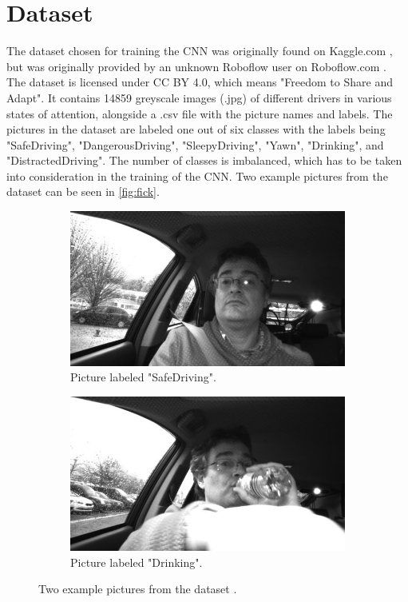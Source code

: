 \section{Dataset}
The dataset chosen for training the CNN was originally found on Kaggle.com \cite{kag_set}, but was originally provided by an unknown Roboflow user on Roboflow.com \cite{rob_set}.
The dataset is licensed under CC BY 4.0, which means "Freedom to Share and Adapt".
It contains 14859 greyscale images (.jpg) of different drivers in various states of attention, alongside a .csv file with the picture names and labels. The pictures in the dataset are labeled one out of six classes with the labels being "SafeDriving", "DangerousDriving", "SleepyDriving", "Yawn", "Drinking", and "DistractedDriving". The number of classes is imbalanced, which has to be taken into consideration in the training of the CNN. Two example pictures from the dataset can be seen in \autoref{fig:fick}.
\begin{figure}[H]
    \centering
    \begin{subfigure}[b]{0.47\textwidth}
        \centering
        \includegraphics[width = \textwidth]{content/safe.jpg}
        \caption{Picture labeled "SafeDriving".}
        \label{fig:ggf1}
    \end{subfigure}
    \hfill
    \begin{subfigure}[b]{0.47\textwidth}
        \centering
        \includegraphics[width = \textwidth]{content/drinking.jpg}
        \caption{Picture labeled "Drinking".}
        \label{fig:ggf2}
    \end{subfigure}
    \caption{Two example pictures from the dataset \cite{rob_set}.}
    \label{fig:fick}
\end{figure}
